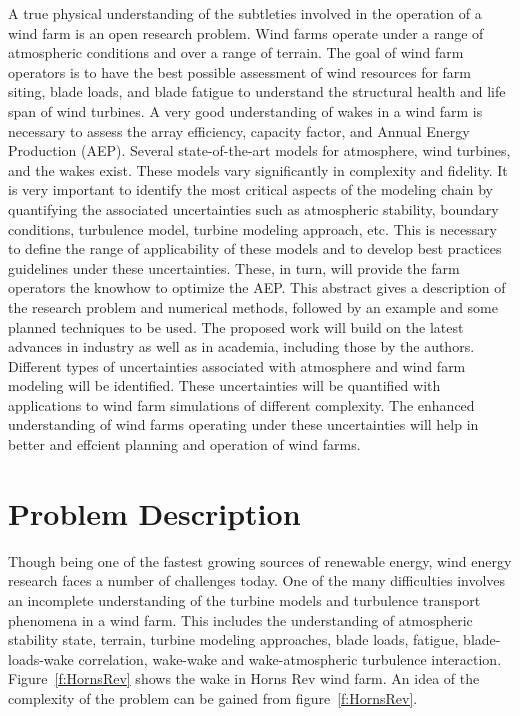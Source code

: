 \documentclass[]{aiaa-tc}%
\begin{document}
A true physical understanding of the subtleties involved in the operation of a wind farm is an open research problem. Wind farms operate under a range of atmospheric conditions and over a range of terrain. The goal of wind farm operators is to have the best possible assessment of wind resources for farm siting, blade loads, and blade fatigue to understand the structural health and life span of wind turbines. A very good understanding of wakes in a wind farm is necessary to assess the array efficiency, capacity factor, and Annual Energy Production (AEP). Several state-of-the-art models for atmosphere, wind turbines, and the wakes exist. These models vary significantly in complexity and fidelity. It is very important to identify the most critical aspects of the modeling chain by quantifying the associated uncertainties such as atmospheric stability, boundary conditions, turbulence model, turbine modeling approach, etc. This is necessary to define the range of applicability of these models and to develop best practices guidelines under these uncertainties. These, in turn, will provide the farm operators the knowhow to optimize the AEP. This abstract gives a description of the research problem and numerical methods, followed by an example and some planned techniques to be used. The proposed work will build on the latest advances in industry as well as in academia, including those by the authors. Different types of uncertainties associated with atmosphere and wind farm modeling will be identified. These uncertainties will be quantified with applications to wind farm simulations of different complexity. The enhanced understanding of wind farms operating under these uncertainties will help in better and effcient planning and operation of wind farms.

\section{Problem Description}
Though being one of the fastest growing sources of renewable energy, wind energy research faces a number of challenges today. One of the many difficulties involves an incomplete understanding of the turbine models and turbulence transport phenomena in a wind farm. This includes the understanding of atmospheric stability state, terrain, turbine modeling approaches, blade loads, fatigue, blade-loads-wake correlation, wake-wake and wake-atmospheric turbulence interaction.  Figure~\ref{f:HornsRev} shows the wake in Horns Rev wind farm. An idea of the complexity of the problem can be gained from figure~\ref{f:HornsRev}.
\end{document}
